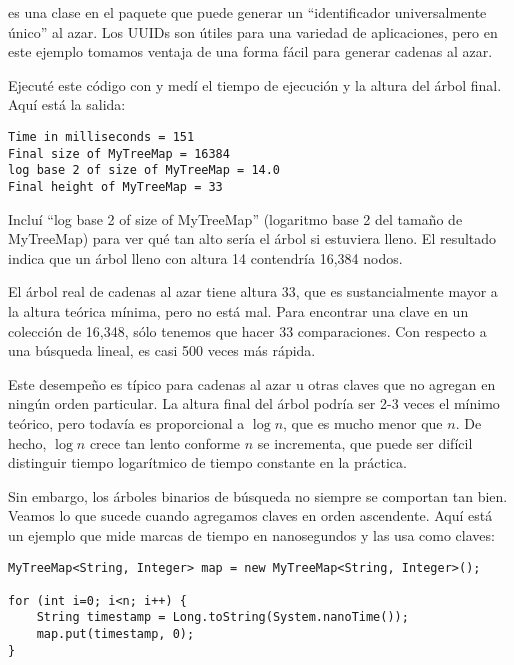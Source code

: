 \documentclass[12pt]{book}
\theoremstyle{exercise}
\begin{document}
 es una clase en el paquete  que puede
generar un ``identificador universalmente único'' al azar. Los UUIDs son
útiles para una variedad de aplicaciones, pero en este ejemplo tomamos
ventaja de una forma fácil para generar cadenas al azar.


Ejecuté este código con  y medí el tiempo de ejecución
y la altura del árbol final. Aquí está la salida:

\begin{verbatim}
Time in milliseconds = 151
Final size of MyTreeMap = 16384
log base 2 of size of MyTreeMap = 14.0
Final height of MyTreeMap = 33
\end{verbatim}

Incluí ``log base 2 of size of MyTreeMap'' (logaritmo base 2 del tamaño de
MyTreeMap) para ver qué tan alto sería el árbol si estuviera lleno. El
resultado indica que un árbol lleno con altura 14 contendría 16,384 nodos.

El árbol real de cadenas al azar tiene altura 33, que es sustancialmente
mayor a la altura teórica mínima, pero no está mal. Para encontrar una
clave en un colección de 16,348, sólo tenemos que hacer 33 comparaciones.
Con respecto a una búsqueda lineal, es casi 500 veces más rápida.


Este desempeño es típico para cadenas al azar u otras claves que no
agregan en ningún orden particular. La altura final del árbol podría ser
2-3 veces el mínimo teórico, pero todavía es proporcional a
$\log n$, que es mucho menor que $n$. De hecho,
$\log n$ crece tan lento conforme $n$ se incrementa, que puede ser
difícil distinguir tiempo logarítmico de tiempo constante en la
práctica.


Sin embargo, los árboles binarios de búsqueda no siempre se comportan tan bien.
Veamos lo que sucede cuando agregamos claves en orden ascendente. Aquí está un
ejemplo que mide marcas de tiempo en nanosegundos y las usa como claves:

\begin{verbatim}
MyTreeMap<String, Integer> map = new MyTreeMap<String, Integer>();

for (int i=0; i<n; i++) {
    String timestamp = Long.toString(System.nanoTime());
    map.put(timestamp, 0);
}
\end{verbatim}
\end{document}
